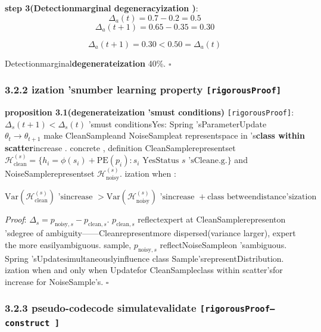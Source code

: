 \documentclass[
  12pt,
]{article}
\begin{document}
\textbf{step 3(Detectionmarginal degeneracyization )}:  \[\Delta_a(t) = 0.7 - 0.2 = 0.5\]
\[\Delta_a(t+1) = 0.65 - 0.35 = 0.30\]

\[\boxed{\Delta_a(t+1) = 0.30 < 0.50 = \Delta_a(t)}\]

Detectionmarginal\textbf{degenerateization } 40\%. \(\square\)

\subsubsection{\texorpdfstring{3.2.2 ization 'snumber learning property
\texttt{{[}rigorousProof{]}}}{3.2.2 ization 'snumber learning  {[}rigorousProof{]}}}\label{ux9000ux5316ux7684ux6570ux5b66ux672cux8d28-ux4e25ux683cux8bc1ux660e}

\textbf{proposition 3.1(degenerateization 'smust conditions)}
\texttt{{[}rigorousProof{]}}: \(\Delta_s(t+1) < \Delta_s(t)\)
'smust conditionsYes: Spring 'sParameterUpdate \(\theta_t \to \theta_{t+1}\)
make CleanSampleand NoiseSampleat representspace in 's\textbf{class within scatter}increase . concrete , definition CleanSamplerepresentset 
\(\mathcal{H}_{\text{clean}}^{(s)} = \{h_i = \phi(s_i) + \text{PE}(p_i) : s_i \text{ YesStatus } s \text{ 'sCleane.g.}\}\)
and NoiseSamplerepresentset  \(\mathcal{H}_{\text{noisy}}^{(s)}\). ization when : 

\[\boxed{\text{Var}(\mathcal{H}_{\text{clean}}^{(s)}) \text{ 'sincrease  } > \text{Var}(\mathcal{H}_{\text{noisy}}^{(s)}) \text{ 'sincrease  } + \text{class betweendistance'sization }}\]

\emph{Proof}: \(\Delta_s = p_{\text{noisy},s} - p_{\text{clean},s}\). \(p_{\text{clean},s}\)
reflectexpert at CleanSamplerepresenton 'sdegree of ambiguity------Cleanrepresentmore dispersed(variance larger), expert the more easilyambiguous. sample, \(p_{\text{noisy},s}\)
reflectNoiseSampleon 'sambiguous. Spring
'sUpdatesimultaneouslyinfluence class Sample'srepresentDistribution. ization when and only when Updatefor CleanSampleclass within scatter'sfor increase for NoiseSample's. \(\square\)

\subsubsection{\texorpdfstring{3.2.3 pseudo-codecode simulatevalidate 
\texttt{{[}rigorousProof---construct {]}}}{3.2.3 pseudo-codecode simulatevalidate  {[}rigorousProof------construct {]}}}\label{ux4f2aux4ee3ux7801ux6a21ux62dfux9a8cux8bc1-ux4e25ux683cux8bc1ux660eux6784ux9020}
\end{document}
